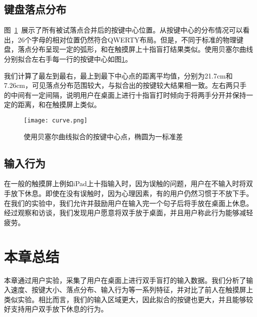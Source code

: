 
\subsection{键盘落点分布}
图~\ref{fig:keyboard-curve}~展示了所有被试落点合并后的按键中心位置。从按键中心的分布情况可以看出，26个字母的相对位置仍然符合QWERTY布局。但是，不同于标准的物理键盘，落点分布呈现一定的弧形，和在触摸屏上十指盲打结果类似\cite{flatglass2011findlater}\cite{2018shitoast}。使用贝塞尔曲线分别拟合左右手每一行的按键中心如图\ref{fig:keyboard-curve}。

我们计算了最左到最右，最上到最下中心点的距离平均值，分别为21.7cm和7.26cm，可见落点分布范围较大，与拟合出的按键较大结果相一致。左右两只手的中间有一定间隔，说明用户在桌面上进行十指盲打时倾向于将两手分开并保持一定的距离，和在触摸屏上类似\cite{flatglass2011findlater}。
\begin{figure}[ht]
  \centering
  \texttt{[image: curve.png]}
  \caption{使用贝塞尔曲线拟合的按键中心点，椭圆为一标准差}
  \label{fig:keyboard-curve}
\end{figure}

\subsection{输入行为}
在一般的触摸屏上例如iPad上十指输入时，因为误触的问题，用户在不输入时将双手放下休息。即使在没有误触时，因为心理因素，有的用户仍然习惯于不放下手\cite{palmboard2020}。在我们的实验中，我们允许并鼓励用户在输入完一个句子后将手放在桌面上休息。经过观察和访谈，我们发现用户愿意将双手放于桌面，并且用户称此行为能够减轻疲劳。

\section{本章总结}
本章通过用户实验，采集了用户在桌面上进行双手盲打的输入数据。我们分析了输入速度、按键大小、落点分布、输入行为等一系列特征，并对比了前人在触摸屏上类似实验。相比而言，我们的输入区域更大，因此拟合的按键也更大，并且能够较好支持用户双手放下休息的行为。